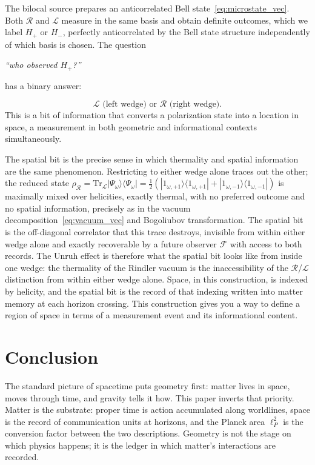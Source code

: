 \documentclass[12pt,a4paper]{article}
\begin{document}
The bilocal source prepares an anticorrelated Bell 
state~\eqref{eq:microstate_vec}. Both $\mathcal{R}$ and 
$\mathcal{L}$ measure in the same basis and obtain 
definite outcomes, which we label $H_+$ or $H_-$, 
perfectly anticorrelated by the Bell state structure 
independently of which basis is chosen. The question

\begin{center}
\textit{``who observed $H_+$?''}
\end{center}
has a binary answer:

\begin{equation}
  \mathcal{L}\text{ (left wedge)  or } \mathcal{R}\text{ (right wedge)}.
\label{eq:spatial_bit} 
\end{equation}
This is a bit of information that converts a 
polarization state into a location in space, a measurement 
in both geometric and informational contexts simultaneously.

The spatial bit is the precise sense in which thermality 
and spatial information are the same phenomenon. 
Restricting to either wedge alone traces out the other; 
the reduced state $\rho_{\mathcal{R}} = 
\mathrm{Tr}_{\mathcal{L}}|\Psi_\omega\rangle\langle\Psi_\omega| 
= \frac{1}{2}(|1_{\omega,+1}\rangle\langle 1_{\omega,+1}| 
+ |1_{\omega,-1}\rangle\langle 1_{\omega,-1}|)$ is 
maximally mixed over helicities, exactly thermal, 
with no preferred outcome and no spatial information, 
precisely as in the vacuum decomposition~\eqref{eq:vacuum_vec} 
and Bogoliubov transformation. 
The spatial bit is the off-diagonal correlator that this 
trace destroys, invisible from within either wedge alone 
and exactly recoverable by a future observer $\mathcal{F}$ 
with access to both records. The Unruh effect is therefore 
what the spatial bit looks like from inside one wedge: 
the thermality of the Rindler vacuum is the 
inaccessibility of the $\mathcal{R}$/$\mathcal{L}$ 
distinction from within either wedge alone. Space, in 
this construction, is indexed by helicity, and the 
spatial bit is the record of that indexing written into 
matter memory at each horizon crossing. This construction gives you a way to define a region of space in terms of a measurement event and its informational content. 


\section{Conclusion}
\label{sec:conclusion}

The standard picture of spacetime puts geometry first: 
matter lives in space, moves through time, and gravity 
tells it how. This paper inverts that priority. Matter 
is the substrate: proper time is action accumulated 
along worldlines, space is the record of communication units
at horizons, and the Planck area $\ell_P^2$ is the 
conversion factor between the two
descriptions. Geometry
is not the stage on which physics happens; it is the 
ledger in which matter's interactions are recorded.
\end{document}
